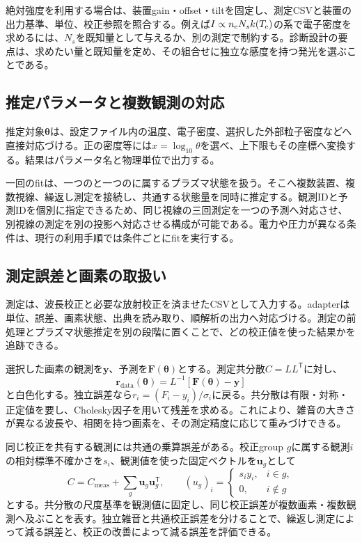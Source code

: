 絶対強度を利用する場合は、装置gain・offset・tiltを固定し、測定CSVと装置の出力基準、単位、校正参照を照合する。例えば$I\propto n_{\mathrm e} N_s k(T_{\mathrm e})$の系で電子密度を求めるには、$N_s$を既知量として与えるか、別の測定で制約する。診断設計の要点は、求めたい量と既知量を定め、その組合せに独立な感度を持つ発光を選ぶことである。

\subsection{推定パラメータと複数観測の対応}
推定対象$\boldsymbol\theta$は、設定ファイル内の温度、電子密度、選択した外部粒子密度などへ直接対応づける。正の密度等には$x=\log_{10}\theta$を選べ、上下限もその座標へ変換する。結果はパラメータ名と物理単位で出力する。

一回のfitは、一つのと一つのに属するプラズマ状態を扱う。そこへ複数装置、複数視線、繰返し測定を接続し、共通する状態量を同時に推定する。観測IDと予測IDを個別に指定できるため、同じ視線の三回測定を一つの予測へ対応させ、別視線の測定を別の投影へ対応させる構成が可能である。電力や圧力が異なる条件は、現行の利用手順では条件ごとにfitを実行する。

\subsection{測定誤差と画素の取扱い}
測定は、波長校正と必要な放射校正を済ませたCSVとして入力する。adapterは単位、誤差、画素状態、出典を読み取り、順解析の出力へ対応づける。測定の前処理とプラズマ状態推定を別の段階に置くことで、どの校正値を使った結果かを追跡できる。

選択した画素の観測を$\boldsymbol y$、予測を$\boldsymbol F(\boldsymbol\theta)$とする。測定共分散$C=LL^\mathsf T$に対し、
\begin{equation}
\boldsymbol r_{\mathrm{data}}(\boldsymbol\theta)
=L^{-1}\left[\boldsymbol F(\boldsymbol\theta)-\boldsymbol y\right]
\label{eq:whiten}
\end{equation}
と白色化する。独立誤差なら$r_i=(F_i-y_i)/\sigma_i$に戻る。共分散は有限・対称・正定値を要し、Cholesky因子を用いて残差を求める。これにより、雑音の大きさが異なる波長や、相関を持つ画素を、その測定精度に応じて重みづけできる。

同じ校正を共有する観測には共通の乗算誤差がある。校正group $g$に属する観測$i$の相対標準不確かさを$s_i$、観測値を使った固定ベクトルを$\boldsymbol u_g$として
\begin{equation}
C=C_{\mathrm{meas}}+\sum_g\boldsymbol u_g\boldsymbol u_g^\mathsf T,
\qquad (u_g)_i=\begin{cases}s_iy_i,&i\in g,\\0,&i\notin g\end{cases}
\label{eq:calcov}
\end{equation}
とする。共分散の尺度基準を観測値に固定し、同じ校正誤差が複数画素・複数観測へ及ぶことを表す。独立雑音と共通校正誤差を分けることで、繰返し測定によって減る誤差と、校正の改善によって減る誤差を評価できる。


